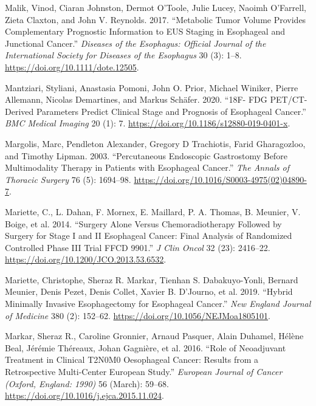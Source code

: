 \documentclass[
  letterpaper,
]{scrbook}
\newlength{\cslhangindent}
\newenvironment{CSLReferences}[2] %
 {\begin{list}{}{%
  \setlength{\itemindent}{0pt}
  \setlength{\leftmargin}{0pt}
  \setlength{\parsep}{0pt}
  \ifodd #1
   \setlength{\leftmargin}{\cslhangindent}
   \setlength{\itemindent}{-1\cslhangindent}
  \fi
  \setlength{\itemsep}{#2\baselineskip}}}
 {\end{list}}
\begin{document}
\begin{CSLReferences}{1}{0}
Malik, Vinod, Ciaran Johnston, Dermot O'Toole, Julie Lucey, Naoimh
O'Farrell, Zieta Claxton, and John V. Reynolds. 2017. {``Metabolic Tumor
Volume Provides Complementary Prognostic Information to {EUS} Staging in
Esophageal and Junctional Cancer.''} \emph{Diseases of the Esophagus:
Official Journal of the International Society for Diseases of the
Esophagus} 30 (3): 1--8. \url{https://doi.org/10.1111/dote.12505}.

Mantziari, Styliani, Anastasia Pomoni, John O. Prior, Michael Winiker,
Pierre Allemann, Nicolas Demartines, and Markus Schäfer. 2020. {``{18F}-
{FDG} {PET}/{CT}-Derived Parameters Predict Clinical Stage and Prognosis
of Esophageal Cancer.''} \emph{BMC Medical Imaging} 20 (1): 7.
\url{https://doi.org/10.1186/s12880-019-0401-x}.

Margolis, Marc, Pendleton Alexander, Gregory D Trachiotis, Farid
Gharagozloo, and Timothy Lipman. 2003. {``Percutaneous Endoscopic
Gastrostomy Before Multimodality Therapy in Patients with Esophageal
Cancer.''} \emph{The Annals of Thoracic Surgery} 76 (5): 1694--98.
\url{https://doi.org/10.1016/S0003-4975(02)04890-7}.

Mariette, C., L. Dahan, F. Mornex, E. Maillard, P. A. Thomas, B.
Meunier, V. Boige, et al. 2014. {``Surgery Alone Versus
Chemoradiotherapy Followed by Surgery for Stage {I} and {II} Esophageal
Cancer: Final Analysis of Randomized Controlled Phase {III} Trial {FFCD}
9901.''} \emph{J Clin Oncol} 32 (23): 2416--22.
\url{https://doi.org/10.1200/JCO.2013.53.6532}.

Mariette, Christophe, Sheraz R. Markar, Tienhan S. Dabakuyo-Yonli,
Bernard Meunier, Denis Pezet, Denis Collet, Xavier B. D'Journo, et al.
2019. {``Hybrid {Minimally} {Invasive} {Esophagectomy} for {Esophageal}
{Cancer}.''} \emph{New England Journal of Medicine} 380 (2): 152--62.
\url{https://doi.org/10.1056/NEJMoa1805101}.

Markar, Sheraz R., Caroline Gronnier, Arnaud Pasquer, Alain Duhamel,
Hélène Beal, Jérémie Théreaux, Johan Gagnière, et al. 2016. {``Role of
Neoadjuvant Treatment in Clinical {T2N0M0} Oesophageal Cancer: Results
from a Retrospective Multi-Center {European} Study.''} \emph{European
Journal of Cancer (Oxford, England: 1990)} 56 (March): 59--68.
\url{https://doi.org/10.1016/j.ejca.2015.11.024}.


\end{CSLReferences}
\end{document}
